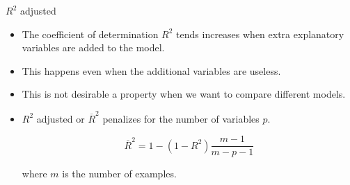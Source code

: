 \documentclass[handout]{beamer}
\begin{document}
\begin{frame}{$R^2$ adjusted}
 \scriptsize{
 \begin{itemize}
  \item The coefficient of determination $R^2$ tends increases when extra explanatory variables are added to the model.
  
  \item This happens even when the additional variables are useless.
  
  \item This is not desirable a property  when we want to compare different models.

\item $R^2$ adjusted or $\overline{R}^2$ penalizes for the number of variables $p$.
 
\begin{displaymath}
 \overline{R}^2= 1-(1-R^2)\frac{m-1}{m-p-1}
\end{displaymath}

where $m$ is the number of examples.

 \end{itemize}
 }
\end{frame}
\end{document}
